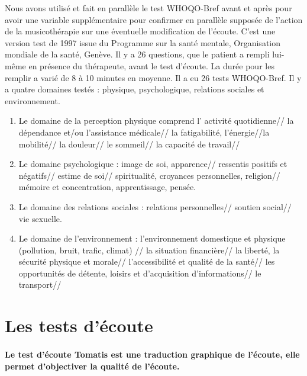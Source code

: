 Nous avons utilisé et fait en parallèle le test WHOQO-Bref avant et
après pour avoir une variable supplémentaire pour confirmer en
parallèle supposée de l'action de la musicothérapie sur une éventuelle modification de l'écoute.  C'est une
version test de 1997 issue du Programme sur la santé mentale,
Organisation mondiale de la santé, Genève. Il y a 26 questions, que le
patient a rempli lui-même en présence du thérapeute, avant le test
d'écoute. La durée pour les remplir a varié de 8 à 10 minutes en
moyenne.  Il a eu 26 tests WHOQO-Bref.
Il y a quatre domaines testés : physique, psychologique, relations sociales et environnement.
\begin{enumerate}
	\item  Le domaine de la perception physique comprend l' activité quotidienne// la dépendance et/ou l'assistance médicale// la fatigabilité, l'énergie//la mobilité// la douleur// le sommeil// la capacité de travail//
	
		 \item Le domaine psychologique :  image de soi, apparence// ressentis positifs et négatifs// estime de soi// spiritualité, croyances personnelles, religion// mémoire et concentration, apprentissage, pensée.
		
			\item Le domaine des relations sociales : relations personnelles// soutien social// vie sexuelle.
			
			\item Le domaine de l'environnement : l'environnement domestique et  physique (pollution, bruit, trafic, climat) // la situation financière//  la liberté, la sécurité physique et morale// l'accessibilité et qualité de la santé// les opportunités de détente, loisirs et d'acquisition d'informations// le transport// 
		\end{enumerate}
		
	


 \section{Les tests d'écoute} 	
 
 \paragraph{Le test d'écoute Tomatis est une traduction graphique de l'écoute, elle permet d'objectiver la qualité de l'écoute.} 
 
